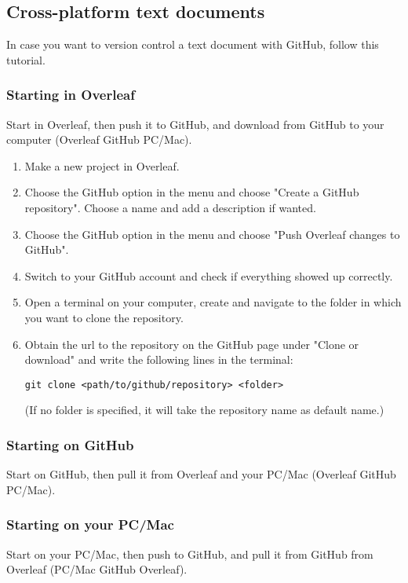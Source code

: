\documentclass{article}
\begin{document}
\subsection{Cross-platform text documents}
In case you want to version control a text document with GitHub, follow this tutorial.

\subsubsection{Starting in Overleaf}
Start in Overleaf, then push it to GitHub, and download from GitHub to your computer
(Overleaf \rightarrow GitHub \rightarrow PC/Mac).

\begin{enumerate}
    \item Make a new project in Overleaf.
    \item Choose the GitHub option in the menu and choose "Create a GitHub repository". Choose a name and add a description if wanted.
    \item Choose the GitHub option in the menu and choose "Push Overleaf changes to GitHub".
    \item Switch to your GitHub account and check if everything showed up correctly.
    \item Open a terminal on your computer, create and navigate to the folder in which you want to clone the repository.
    \item Obtain the url to the repository on the GitHub page under "Clone or download" and write the following lines in the terminal: 
    \begin{verbatim}
git clone <path/to/github/repository> <folder>
    \end{verbatim}
    (If no folder is specified, it will take the repository name as default name.)
\end{enumerate}

\subsubsection{Starting on GitHub}
Start on GitHub, then pull it from Overleaf and your PC/Mac
(Overleaf \leftarrow GitHub \rightarrow PC/Mac).

\subsubsection{Starting on your PC/Mac}
Start on your PC/Mac, then push to GitHub, and pull it from GitHub from Overleaf
(PC/Mac \rightarrow GitHub \rightarrow Overleaf).
\end{document}
